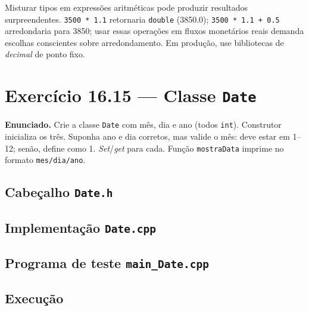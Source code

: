 \documentclass[11pt,a4paper]{article}
\begin{document}
\begin{errocomum}
Misturar tipos em express\~oes aritm\'eticas pode produzir resultados surpreendentes. \texttt{3500 * 1.1} retornaria \texttt{double} (3850.0); \texttt{3500 * 1.1 + 0.5} arredondaria para 3850; usar essas opera\c{c}\~oes em fluxos monet\'arios reais demanda escolhas conscientes sobre arredondamento. Em produ\c{c}\~ao, use bibliotecas de \emph{decimal} de ponto fixo.
\end{errocomum}

\newpage
\section{Exerc\'icio 16.15 --- Classe \texttt{Date}}

\begin{enunciado}
\textbf{Enunciado.} Crie a classe \texttt{Date} com m\^es, dia e ano (todos \texttt{int}). Construtor inicializa os tr\^es. Suponha ano e dia corretos, mas valide o m\^es: deve estar em 1--12; sen\~ao, define como 1. \emph{Set}/\emph{get} para cada. Fun\c{c}\~ao \texttt{mostraData} imprime no formato \texttt{mes/dia/ano}.
\end{enunciado}

\subsection*{Cabe\c{c}alho \texttt{Date.h}}



\subsection*{Implementa\c{c}\~ao \texttt{Date.cpp}}



\subsection*{Programa de teste \texttt{main\_Date.cpp}}



\subsection*{Execu\c{c}\~ao}
\end{document}
